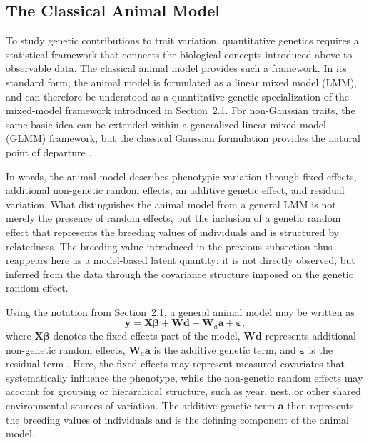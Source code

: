 \subsection{The Classical Animal Model}

To study genetic contributions to trait variation, quantitative genetics requires a statistical framework that connects the biological concepts introduced above to observable data. %
The classical animal model provides such a framework. In its standard form, the animal model is formulated as a linear mixed model (LMM), and can therefore be understood as a quantitative-genetic specialization of the mixed-model framework introduced in Section~2.1. %
For non-Gaussian traits, the same basic idea can be extended within a generalized linear mixed model (GLMM) framework, but the classical Gaussian formulation provides the natural point of departure \parencite{wilson_ecologists_2010, kruuk_estimating_2004, lynch_genetics_1998}. %

In words, the animal model describes phenotypic variation through fixed effects, additional non-genetic random effects, an additive genetic effect, and residual variation. %
What distinguishes the animal model from a general LMM is not merely the presence of random effects, but the inclusion of a genetic random effect that represents the breeding values of individuals and is structured by relatedness. %
The breeding value introduced in the previous subsection thus reappears here as a model-based latent quantity: it is not directly observed, but inferred from the data through the covariance structure imposed on the genetic random effect. %

Using the notation from Section~2.1, a general animal model may be written as
\[
\mathbf{y} = \mathbf{X}\boldsymbol{\beta} + \mathbf{W}\mathbf{d} + \mathbf{W}_a\mathbf{a} + \boldsymbol{\varepsilon},
\]
where $\mathbf{X}\boldsymbol{\beta}$ denotes the fixed-effects part of the model, $\mathbf{W}\mathbf{d}$ represents additional non-genetic random effects, $\mathbf{W}_a\mathbf{a}$ is the additive genetic term, and $\boldsymbol{\varepsilon}$ is the residual term \parencite{kruuk_estimating_2004, FILL_FREDERICK_ANIMALMODEL}. %
Here, the fixed effects may represent measured covariates that systematically influence the phenotype, while the non-genetic random effects may account for grouping or hierarchical structure, such as year, nest, or other shared environmental sources of variation. %
The additive genetic term $\mathbf{a}$ then represents the breeding values of individuals and is the defining component of the animal model. %

